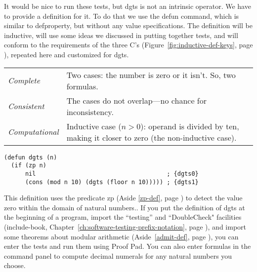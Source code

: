 It would be nice to run these tests, but \textsf{dgts} is not an intrinsic operator.
We have to provide a definition for it.
To do that we use the \textsf{defun} command, which is similar to \textsf{defproperty},
but without any value specifications. The definition will be inductive, will
use some ideas we discussed in putting together tests,
and will conform to the requirements of the three C's
(Figure~\ref{fig:inductive-def-keys}, page \pageref{fig:inductive-def-keys}),
repeated here and customized for \textsf{dgts}.
\begin{samepage}
\begin{center}
\begin{tabular}{lp{3.5in}}
\emph{Complete}      & Two cases: the number is zero or it isn't. So, two formulas.\\
\emph{Consistent}    & The cases do not overlap---no chance for inconsistency.\\
\emph{Computational} & Inductive case ($n > 0$): operand is
                       divided by ten, making it closer to zero
                       (the non-inductive case).
\end{tabular}
\end{center}
\end{samepage}

\label{dgts-defun}
\begin{Verbatim}
(defun dgts (n)
  (if (zp n)
      nil                                     ; {dgts0}
      (cons (mod n 10) (dgts (floor n 10))))) ; {dgts1}
\end{Verbatim}

This definition uses the predicate \textsf{zp}
(Aside \ref{zp-def}, page \pageref{zp-def})
to detect the value zero within the domain of natural numbers..
If you put the definition of \textsf{dgts} at the beginning of a program,
import the ``testing'' and ``DoubleCheck" facilities
(\textsf{include-book},
Chapter~\ref{ch:software-testing-prefix-notation}, page \pageref{ch:software-testing-prefix-notation}),
and import some theorems about modular arithmetic
(Aside~\ref{admit-def}, page \pageref{admit-def}),
you can enter the tests and run them using Proof Pad.
You can also enter formulas in the command panel to compute
decimal numerals for any natural numbers you choose.

